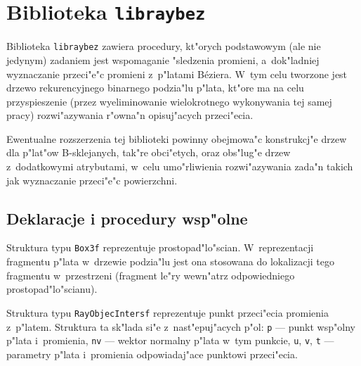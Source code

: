 

\chapter{Biblioteka \texttt{libraybez}}

Biblioteka \texttt{libraybez} zawiera procedury, kt"orych podstawowym
(ale nie jedynym) zadaniem jest wspomaganie "sledzenia promieni, a~dok"ladniej
wyznaczanie przeci"e"c promieni z~p"latami B\'{e}ziera. W~tym celu tworzone
jest drzewo rekurencyjnego binarnego podzia"lu p"lata, kt"ore ma na celu
przyspieszenie (przez wyeliminowanie wielokrotnego wykonywania tej samej
pracy) rozwi"azywania r"owna"n opisuj"acych przeci"ecia.

Ewentualne rozszerzenia tej biblioteki powinny obejmowa"c konstrukcj"e drzew
dla p"lat"ow B-sklejanych, tak"re obci"etych, oraz obs"lug"e drzew
z~dodatkowymi atrybutami, w~celu umo"rliwienia rozwi"azywania zada"n takich
jak wyznaczanie przeci"e"c powierzchni.

\section{Deklaracje i procedury wsp"olne}

\hspace*{\parindent} Struktura typu \texttt{Box3f} reprezentuje prostopad"lo"scian.
W~reprezentacji fragmentu p"lata w~drzewie podzia"lu jest ona stosowana
do lokalizacji tego fragmentu w~przestrzeni (fragment le"ry wewn"atrz
odpowiedniego prostopad"lo"scianu).

\vspace{\bigskipamount}
\begin{sloppypar}
Struktura typu \texttt{RayObjecIntersf} reprezentuje punkt przeci"ecia
promienia z~p"latem. Struktura ta sk"lada si"e z~nast"epuj"acych p"ol:
\texttt{p} --- punkt wsp"olny p"lata i~promienia, \texttt{nv} --- wektor
normalny p"lata w~tym punkcie, \texttt{u}, \texttt{v}, \texttt{t} ---
parametry p"lata i~promienia odpowiadaj"ace punktowi przeci"ecia.
\end{sloppypar}


